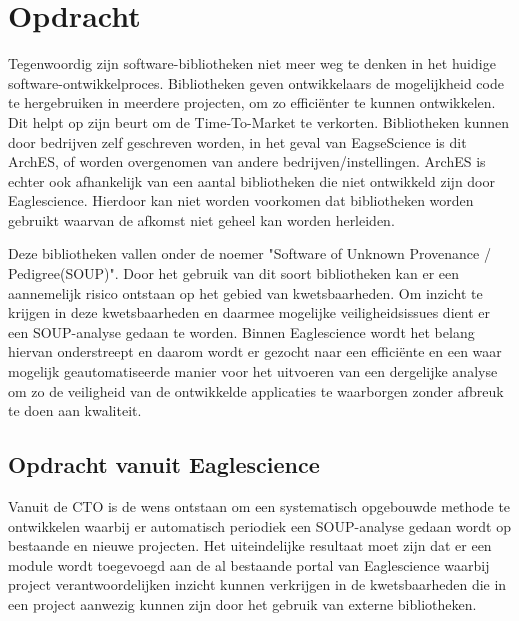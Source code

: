 
\chapter{Opdracht}\label{ch:opdracht} %

Tegenwoordig zijn software-bibliotheken niet meer weg te denken in het huidige software-ontwikkelproces.
Bibliotheken geven ontwikkelaars de mogelijkheid code te hergebruiken in meerdere projecten, om zo efficiënter te kunnen ontwikkelen.
Dit helpt op zijn beurt om de Time-To-Market te verkorten.
Bibliotheken kunnen door bedrijven zelf geschreven worden, in het geval van EagseScience is dit ArchES, of worden overgenomen van andere bedrijven/instellingen.
ArchES is echter ook afhankelijk van een aantal bibliotheken die niet ontwikkeld zijn door Eaglescience.
Hierdoor kan niet worden voorkomen dat bibliotheken worden gebruikt waarvan de afkomst niet geheel kan worden herleiden.

Deze bibliotheken vallen onder de noemer "Software of Unknown Provenance / Pedigree(SOUP)".
Door het gebruik van dit soort bibliotheken kan er een aannemelijk risico ontstaan op het gebied van kwetsbaarheden.
Om inzicht te krijgen in deze kwetsbaarheden en daarmee mogelijke veiligheidsissues dient er een SOUP-analyse gedaan te worden.
Binnen Eaglescience wordt het belang hiervan onderstreept en daarom wordt er gezocht naar een efficiënte en een waar mogelijk geautomatiseerde manier voor het uitvoeren van een dergelijke analyse om zo de veiligheid van de ontwikkelde applicaties te waarborgen zonder afbreuk te doen aan kwaliteit.

\section{Opdracht vanuit Eaglescience}\label{sec:opdracht-vanuit-eaglescience}
Vanuit de CTO is de wens ontstaan om een systematisch opgebouwde methode te ontwikkelen waarbij er automatisch periodiek een SOUP-analyse gedaan wordt op bestaande en nieuwe projecten.
Het uiteindelijke resultaat moet zijn dat er een module wordt toegevoegd aan de al bestaande portal van Eaglescience waarbij project verantwoordelijken inzicht kunnen verkrijgen in de kwetsbaarheden die in een project aanwezig kunnen zijn door het gebruik van externe bibliotheken.

